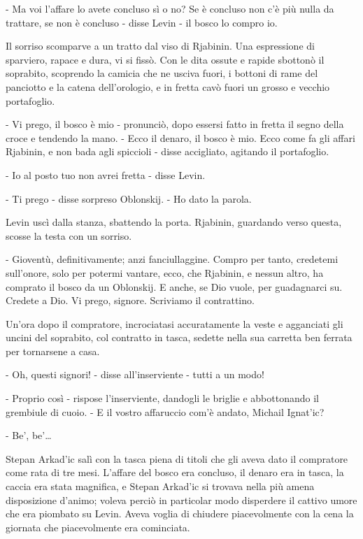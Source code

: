 - Ma voi l'affare lo avete concluso sì o no? Se è concluso non c'è più nulla da trattare, se non è concluso - disse Levin - il bosco lo compro io. 

Il sorriso scomparve a un tratto dal viso di Rjabinin. Una espressione di sparviero, rapace e dura, vi si fissò. Con le dita ossute e rapide sbottonò il soprabito, scoprendo la camicia che ne usciva fuori, i bottoni di rame del panciotto e la catena dell'orologio, e in fretta cavò fuori un grosso e vecchio portafoglio. 

- Vi prego, il bosco è mio - pronunciò, dopo essersi fatto in fretta il segno della croce e tendendo la mano. - Ecco il denaro, il bosco è mio. Ecco come fa gli affari Rjabinin, e non bada agli spiccioli - disse accigliato, agitando il portafoglio. 

- Io al posto tuo non avrei fretta - disse Levin. 

- Ti prego - disse sorpreso Oblonskij. - Ho dato la parola. 

Levin uscì dalla stanza, sbattendo la porta. Rjabinin, guardando verso questa, scosse la testa con un sorriso. 

- Gioventù, definitivamente; anzi fanciullaggine. Compro per tanto, credetemi sull'onore, solo per potermi vantare, ecco, che Rjabinin, e nessun altro, ha comprato il bosco da un Oblonskij. E anche, se Dio vuole, per guadagnarci su. Credete a Dio. Vi prego, signore. Scriviamo il contrattino. 

Un'ora dopo il compratore, incrociatasi accuratamente la veste e agganciati gli uncini del soprabito, col contratto in tasca, sedette nella sua carretta ben ferrata per tornarsene a casa. 

- Oh, questi signori! - disse all'inserviente - tutti a un modo! 

- Proprio così - rispose l'inserviente, dandogli le briglie e abbottonando il grembiule di cuoio. - E il vostro affaruccio com'è andato, Michail Ignat'ic? 

- Be', be'\ldots{} 

\label{xvii-1} 

Stepan Arkad'ic salì con la tasca piena di titoli che gli aveva dato il compratore come rata di tre mesi. L'affare del bosco era concluso, il denaro era in tasca, la caccia era stata magnifica, e Stepan Arkad'ic si trovava nella più amena disposizione d'animo; voleva perciò in particolar modo disperdere il cattivo umore che era piombato su Levin. Aveva voglia di chiudere piacevolmente con la cena la giornata che piacevolmente era cominciata. 

